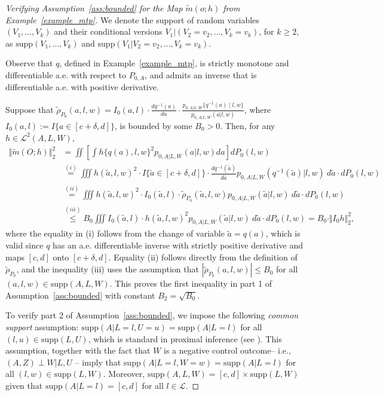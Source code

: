 \documentclass[twoside,11pt]{article}
\newcommand{\mc}{\mathcal}
\begin{document}
\begin{proof}[Verifying Assumption~\ref{ass:bounded} for the Map $\widetilde{m}(o;h)$ from Example~\ref{example_mtp}]
    
We denote the support of random variables $(V_1,\dots,V_k)$ and their conditional versions $V_1|(V_2=v_2,\dots,V_k=v_k)$, for $k\ge2$, as $\text{supp}(V_1,\dots,V_k)$ and $\text{supp}(V_1|V_2=v_2,\dots,V_k=v_k)$.

 Observe that $q$, defined in Example~\ref{example_mtp}, is strictly monotone and differentiable a.e. with respect to $P_{0,A}$, and admits an inverse that is differentiable a.e. with positive derivative.

Suppose that $\tilde\rho_{P_0}(a,l,w) = I_0(a,l)\cdot\frac{dq^{-1}(a)}{da}\cdot\frac{p_{0,A|L,W}\{q^{-1}(a)\mid l,w\}}{p_{0,A|L,W}(a|l,w)}$, where $I_0(a,l):=I\{a\in[c+\delta,d]\}$, is bounded by some $B_0>0$. Then, for any $h\in\mathcal{L}^2(A,L,W)$,
\begin{align*}
    \Vert\widetilde{m}(O;h)\Vert_2^2&=\iint \left[\int h\{q(a),l,w\}^2p_{0,A|L,W}(a|l,w)da\right]dP_0(l,w)\\
    &\stackrel{(i)}{=}\iiint h(\tilde a,l,w)^2\cdot I\{\tilde a\in[c+\delta,d]\}\cdot \frac{dq^{-1}(\tilde a)}{d\tilde a}p_{0,A|L,W}(q^{-1}(\tilde a)|l,w)\:d\tilde a\cdot dP_{0}(l,w)\\
    &\stackrel{(ii)}{=}\iiint h(\tilde a,l,w)^2\cdot I_0(\tilde a,l)\cdot\tilde \rho_{P_0}(\tilde a,l,w)p_{0,A|L,W}(\tilde a|l,w)\:d\tilde a\cdot dP_{0}(l,w)\\
    &\stackrel{(iii)}{\le} B_0\iiint I_0(\tilde a,l)\cdot h(\tilde a,l,w)^2p_{0,A|L,W}(\tilde a|l,w)\:d\tilde a\cdot dP_0(l,w)=B_0\cdot \Vert I_0h\Vert_2^2,
\end{align*}
    where the equality in (i) follows from the change of variable $\tilde a = q(a)$, which is valid since $q$ has an a.e. differentiable inverse with strictly positive derivative and maps $[c,d]$ onto $[c+\delta,d]$. Equality (ii) follows directly from the definition of $\tilde\rho_{P_0}$, and the inequality (iii) uses the assumption that $|\tilde\rho_{P_0}(a,l,w)|\le B_0$ for all $(a,l,w)\in\text{supp}(A,L,W)$. This proves the first inequality in part 1 of Assumption~\ref{ass:bounded} with constant $B_2=\sqrt{B_0}$.

    To verify part 2 of Assumption~\ref{ass:bounded}, we impose the following \textit{common support} assumption: $ \text{supp}(A|L=l,U=u)=\text{supp}(A|L=l)$ for all $(l,u)\in\text{supp}(L,U)$, which is standard in proximal inference (see \cite{olivas2025chap3}). This assumption, together with the fact that $W$ is a negative control outcome-- i.e., $(A,Z)\perp W|L,U$ -- imply that $\text{supp}(A|L=l,W=w)=\text{supp}(A|L=l)$ for all $(l,w)\in\text{supp}(L,W)$. Moreover, $\text{supp}(A,L,W)=[c,d]\times\text{supp}(L,W)$ given that $\text{supp}(A|L=l)=[c,d]$ for all $l\in\mc{L}$.
    

\end{proof}
\end{document}
